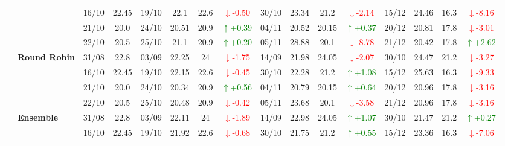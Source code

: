 \documentclass{ieeeaccess}
\begin{document}
{\begin{longtable}{llcc|cccc|cccc|cccc}
& 
& 16/10 & 22.45 & 19/10 & 22.1 & 22.6 & \textcolor{red}{\(\downarrow\)-0.50} & 30/10 & 23.34 & 21.2 & \textcolor{red}{\(\downarrow\)-2.14} & 15/12 & 24.46 & 16.3 & \textcolor{red}{\(\downarrow\)-8.16} \\

& 
& 21/10 & 20.0 & 24/10 & 20.51 & 20.9 & \textcolor{green}{\(\uparrow\)+0.39} & 04/11 & 20.52 & 20.15 & \textcolor{green}{\(\uparrow\)+0.37} & 20/12 & 20.81 & 17.8 & \textcolor{red}{\(\downarrow\)-3.01} \\

&
& 22/10 & 20.5 & 25/10 & 21.1 & 20.9 & \textcolor{green}{\(\uparrow\)+0.20} & 05/11 & 28.88 & 20.1 & \textcolor{red}{\(\downarrow\)-8.78} & 21/12 & 20.42 & 17.8 & \textcolor{green}{\(\uparrow\)+2.62} \\
\cmidrule(lr){2-16}


& \textbf{Round Robin}
& 31/08 & 22.8 & 03/09 & 22.25 & 24 & \textcolor{red}{\(\downarrow\)-1.75} & 14/09 & 21.98 & 24.05 & \textcolor{red}{\(\downarrow\)-2.07} & 30/10 & 24.47 & 21.2 & \textcolor{red}{\(\downarrow\)-3.27} \\

&
& 16/10 & 22.45 & 19/10 & 22.15 & 22.6 & \textcolor{red}{\(\downarrow\)-0.45} & 30/10 & 22.28 & 21.2 & \textcolor{green}{\(\uparrow\)+1.08} & 15/12 & 25.63 & 16.3 & \textcolor{red}{\(\downarrow\)-9.33} \\

&
& 21/10 & 20.0 & 24/10 & 20.34 & 20.9 & \textcolor{green}{\(\uparrow\)+0.56} & 04/11 & 20.79 & 20.15 & \textcolor{green}{\(\uparrow\)+0.64} & 20/12 & 20.96 & 17.8 & \textcolor{red}{\(\downarrow\)-3.16} \\

&
& 22/10 & 20.5 & 25/10 & 20.48 & 20.9 & \textcolor{red}{\(\downarrow\)-0.42} & 05/11 & 23.68 & 20.1 & \textcolor{red}{\(\downarrow\)-3.58} & 21/12 & 20.96 & 17.8 & \textcolor{red}{\(\downarrow\)-3.16} \\
\cmidrule(lr){2-16}


& \textbf{Ensemble}
& 31/08 & 22.8 & 03/09 & 22.11 & 24 & \textcolor{red}{\(\downarrow\)-1.89} & 14/09 & 22.98 & 24.05 & \textcolor{green}{\(\uparrow\)+1.07} & 30/10 & 21.47 & 21.2 & \textcolor{green}{\(\uparrow\)+0.27} \\

&
& 16/10 & 22.45 & 19/10 & 21.92 & 22.6 & \textcolor{red}{\(\downarrow\)-0.68} & 30/10 & 21.75 & 21.2 & \textcolor{green}{\(\uparrow\)+0.55} & 15/12 & 23.36 & 16.3 & \textcolor{red}{\(\downarrow\)-7.06} \\


\end{longtable}}
\end{document}

